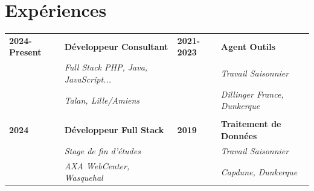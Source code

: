 \documentclass[a4paper, 12pt]{article}
\begin{document}
\begin{minipage}[t]{1\textwidth}
	\section*{\textcolor{sectioncolor}{Expériences}}
	\begin{tabular}{ m{} m{} m{} m{} }
		\textbf{2024-Present} & \textbf{Développeur Consultant}              & \textbf{2021-2023} & \textbf{Agent Outils}                \\
		                      & \textit{Full Stack PHP, Java, JavaScript...} &                    & \textit{Travail Saisonnier}          \\
		                      & \textit{Talan, Lille/Amiens}                 &                    & \textit{Dillinger France, Dunkerque} \\
		                      &                                              &                    &                                      \\
		\textbf{2024}         & \textbf{Développeur Full Stack}              & \textbf{2019}      & \textbf{Traitement de Données}       \\
		                      & \textit{Stage de fin d'études}               &                    & \textit{Travail Saisonnier}          \\
		                      & \textit{AXA WebCenter, Wasquehal}            &                    & \textit{Capdune, Dunkerque}          \\
	\end{tabular}
\end{minipage}
\end{document}
